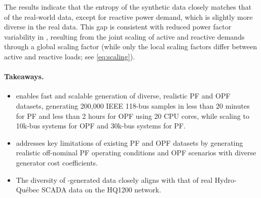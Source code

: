 The results indicate that the entropy of the synthetic data closely matches that of the real-world data, except for reactive power demand, which is slightly more diverse in the real data. This gap is consistent with reduced power factor variability in \datakit, resulting from the joint scaling of active and reactive demands through a global scaling factor (while only the local scaling factors differ between active and reactive loads; see \cref{eq:scaling}).\\




\begin{boxH}
\paragraph{Takeaways.}
\begin{itemize}
\item \datakit enables fast and scalable generation of diverse, realistic PF and OPF datasets, generating 200,000 IEEE 118-bus samples in less than 20 minutes for PF and less than 2 hours for OPF using 20 CPU cores, while scaling to 10k-bus systems for OPF and 30k-bus systems for PF.
\item \datakit addresses key limitations of existing PF and OPF datasets by generating realistic off-nominal PF operating conditions and OPF scenarios with diverse generator cost coefficients.
\item The diversity of \datakit-generated data closely aligns with that of real Hydro-Québec SCADA data on the HQ1200 network.
\end{itemize}
\end{boxH}



